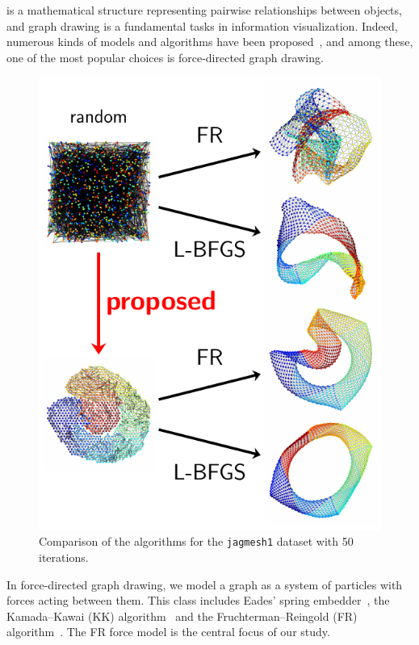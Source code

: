 \documentclass[dvipdfmx,10pt,journal,compsoc]{IEEEtran}
\begin{document}
 is a mathematical structure representing pairwise relationships between objects, and graph drawing is a fundamental tasks in information visualization.
Indeed, numerous kinds of models and algorithms have been proposed~\cite{tutteHowDrawGraph1963,chrobakLineartimeAlgorithmDrawing1995,sugiyamaMethodsVisualUnderstanding1981}, and among these, one of the most popular choices is force-directed graph drawing.

\begin{figure}[t]
  \centering
  \includegraphics[width=0.9\columnwidth]{fig1/fig1.pdf}
  \caption{
    Comparison of the algorithms for the \texttt{jagmesh1} dataset with 50 iterations.
  }
  \label{fig:fig1}
\end{figure}

In force-directed graph drawing, we model a graph as a system of particles with forces acting between them.
This class includes Eades' spring embedder~\cite{eades1984heuristic}, the Kamada--Kawai (KK) algorithm~\cite{kamadaAlgorithmDrawingGeneral1989} and the Fruchterman--Reingold (FR) algorithm~\cite{fruchtermanGraphDrawingForcedirected1991,kobourovSpringEmbeddersForce2012}.
The FR force model is the central focus of our study.
\end{document}
